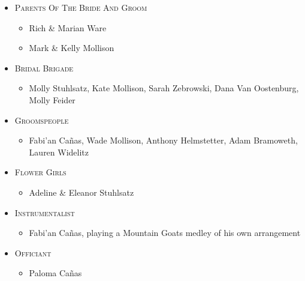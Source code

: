 \documentclass[12pt]{article}
\begin{document}
\begin{minipage}[t]{0.495\textwidth}
\centering

\vspace*{.23in}

\begin{itemize}

\item [] \textsc{Parents Of The Bride And Groom}
\begin{itemize}[topsep=-5pt,itemsep=-1ex,partopsep=1ex,parsep=1ex]
\item [] Rich \& Marian Ware
\item [] Mark \& Kelly Mollison
\end{itemize}

\item [] \textsc{Bridal Brigade}
\begin{itemize}[topsep=-5pt,itemsep=-1ex,partopsep=1ex,parsep=1ex]
\item [] Molly Stuhlsatz, Kate Mollison, Sarah Zebrowski, 
Dana Van Oostenburg, Molly Feider
\end{itemize}

\item [] \textsc{Groomspeople}
\begin{itemize}[topsep=-5pt,itemsep=-1ex,partopsep=1ex,parsep=1ex]
\item [] Fabi\a'an Ca\~{n}as, Wade Mollison, Anthony Helmstetter, 
Adam Bramoweth, Lauren Widelitz
\end{itemize}

\item [] \textsc{Flower Girls}
\begin{itemize}[topsep=-5pt,itemsep=-1ex,partopsep=1ex,parsep=1ex]
\item [] Adeline \& Eleanor Stuhlsatz
\end{itemize}

\item [] \textsc{Instrumentalist}
\begin{itemize}[topsep=-5pt,itemsep=-1ex,partopsep=1ex,parsep=1ex]
\item [] Fabi\a'an Ca\~{n}as, playing a Mountain Goats medley of his own arrangement
\end{itemize}

\item [] \textsc{Officiant}
\begin{itemize}[topsep=-5pt,itemsep=-1ex,partopsep=1ex,parsep=1ex]
\item [] Paloma Ca\~{n}as
\end{itemize}

\end{itemize}
\end{minipage}

\vspace*{\fill}
\end{document}
